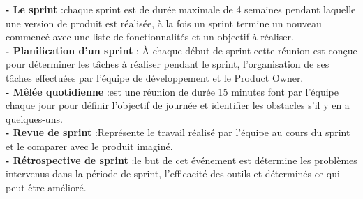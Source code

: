 {\par \noindent \textbf{\Large - Le sprint  }:\textsf{\LARGE chaque sprint est de durée maximale de 4 semaines pendant laquelle une version de produit est réalisée, à la fois un sprint termine un nouveau commencé avec une liste de fonctionnalités et un objectif à réaliser.} \\[0.1cm]

\noindent \textbf{\Large - Planification d’un sprint }: \textsf{\LARGE À chaque début de sprint cette réunion est conçue pour déterminer les tâches à réaliser pendant le sprint, l’organisation de ses tâches effectuées par l’équipe de développement et le Product Owner. }\\[0.1cm]

\noindent \textbf{\Large - Mêlée quotidienne }:\textsf{\LARGE est une réunion de durée 15 minutes font par l’équipe chaque jour pour définir l’objectif de journée et identifier les obstacles s’il y en a quelques-uns.}\\[0.1cm]
\noindent \textbf{\Large - Revue de sprint  }:\textsf{\LARGE Représente le travail réalisé par l’équipe au cours du sprint et le comparer avec le produit imaginé.}\\[0.1cm]
\noindent \textbf{\Large - Rétrospective de sprint   }:\textsf{\LARGE le but de cet événement est détermine les problèmes intervenus dans la période de sprint, l’efficacité des outils et déterminés ce qui peut être amélioré.}\\[0.1cm]

}
